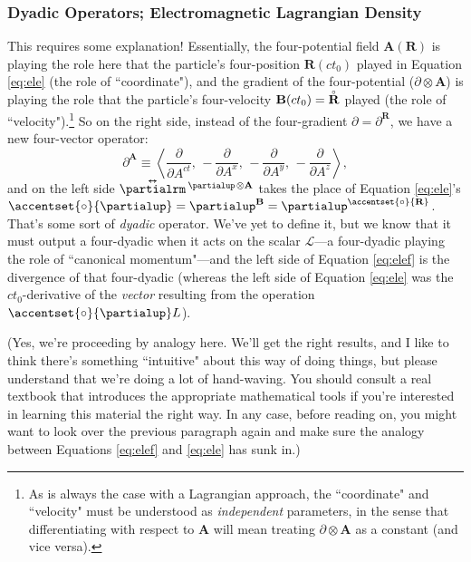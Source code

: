 \documentclass[12pt]{article}
\renewcommand{\mathring}[1]{\accentset{\circ}{#1}}
\renewcommand{\vv}[1]{\mathbf{#1}}
\newcommand{\tightoverset}[2]{%
  \mathop{#2}\limits^{\vbox to -.5ex{\kern-0.75ex\hbox{$#1$}\vss}}}
\newcommand{\inlinedy}[1]{\tightoverset{\text{\tiny$\bm\leftrightarrow$}}{#1}}
\begin{document}
\subsubsection{Dyadic Operators; Electromagnetic Lagrangian Density}

This requires some explanation! Essentially, the four-potential field ${\vv A (\vv R)}$ is playing the role here that the particle's four-position $\vv R (ct_0)$ played in Equation \ref{eq:ele} (the role of ``coordinate"), and the gradient of the four-potential ($\partialup \otimes \vv A$) is playing the role that the particle's four-velocity $\vv B (ct_0) = \mathring{\vv R}$ played (the role of ``velocity").\footnote{As is always the case with a Lagrangian approach, the ``coordinate" and ``velocity" must be understood as \emph{independent} parameters, in the sense that differentiating with respect to $\vv A$ will mean treating $\partialup \otimes \vv A$ as a constant (and vice versa).} So on the right side, instead of the four-gradient $\partialup = \partialup^{\vv R}$, we have a new four-vector operator:
\begin{equation*}
\partialup^{\vv A} \equiv \left \langle \dfrac{\partial}{\partial A^{ct}} , \,  - \dfrac{\partial}{\partial A^x} , \, - \dfrac{\partial}{\partial A^y} , \, - \dfrac{\partial}{\partial A^z} \right \rangle ,
\end{equation*}
and on the left side $\inlinedy{\partialrm} {}^{\partialup \mkern2mu \otimes \vv A}$ takes the place of Equation \ref{eq:ele}'s ${\mathring{\partialup} = \partialup^{\vv B} = \partialup^{\mathring{\vv R}}}$. That's some sort of \emph{dyadic} operator. We've yet to define it, but we know that it must output a four-dyadic when it acts on the scalar $\mathcal{L}$---a four-dyadic playing the role of ``canonical momentum"---and the left side of Equation \ref{eq:elef} is the divergence of that four-dyadic (whereas the left side of Equation \ref{eq:ele} was the $ct_0$-derivative of the \emph{vector} resulting from the operation $\mathring{\partialup} L$).

(Yes, we're proceeding by analogy here. We'll get the right results, and I like to think there's something ``intuitive" about this way of doing things, but please understand that we're doing a lot of hand-waving. You should consult a real textbook that introduces the appropriate mathematical tools if you're interested in learning this material the right way. In any case, before reading on, you might want to look over the previous paragraph again and make sure the analogy between Equations \ref{eq:elef} and \ref{eq:ele} has sunk in.)
\end{document}

